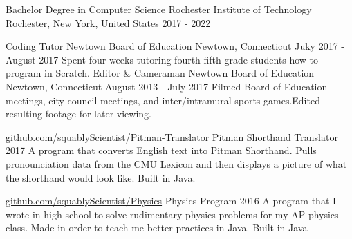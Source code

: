 \documentclass{awesome-cv}
\begin{document}
	\makecvheader[L]

		\begin{cventries}
			\cventry
				{Bachelor Degree in Computer Science}
				{Rochester Institute of Technology}
				{Rochester, New York, United States}
				{2017 - 2022}
				{}
		\end{cventries}
	
	\cvsection{WORK EXPERIENCE}
		\begin{cventries}
			\cventry
				{Coding Tutor}
				{Newtown Board of Education}
				{Newtown, Connecticut}
				{Juky 2017 - August 2017}
				{Spent four weeks tutoring fourth-fifth grade students how to program in Scratch.}
			\cventry
				{Editor \& Cameraman}
				{Newtown Board of Education}
				{Newtown, Connecticut}
				{August 2013 - July 2017}
				{Filmed Board of Education meetings, city council meetings, and inter/intramural sports games.Edited resulting footage for later viewing.}
		\end{cventries}

	\cvsection{PROJECTS}
		\begin{cventries}
			\cventry
				{\href{https://github.com/squablyScientist/Pitman-Translator}github.com/squablyScientist/Pitman-Translator}
				{Pitman Shorthand Translator}
				{2017}
				{}
				{A program that converts English text into Pitman Shorthand. Pulls pronounciation data from the CMU Lexicon and then displays a picture of what the shorthand would look like. Built in Java.}

			\cventry
				{\href{https://github.com/squablyScientist/Physics}{github.com/squablyScientist/Physics}}
				{Physics Program}
				{2016}
				{}
				{A program that I wrote in high school to solve rudimentary physics problems for my AP physics class. Made in order to teach me better practices in Java. Built in Java}
		\end{cventries}
\end{document}
